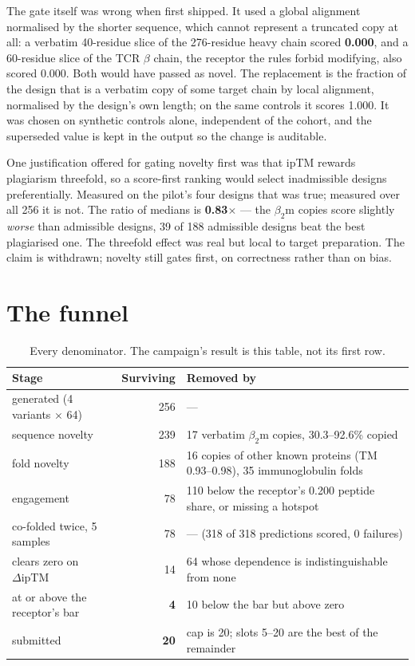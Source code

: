 \documentclass[11pt,a4paper]{article}
\newcommand{\drop}{\ensuremath{\Delta\text{ipTM}}}
\begin{document}
The gate itself was wrong when first shipped. It used a global alignment normalised by the shorter
sequence, which cannot represent a truncated copy at all: a verbatim 40-residue slice of the
276-residue heavy chain scored \textbf{0.000}, and a 60-residue slice of the TCR $\beta$ chain,
the receptor the rules forbid modifying, also scored 0.000. Both would have passed as novel. The
replacement is the fraction of the design that is a verbatim copy of some target chain by local
alignment, normalised by the design's own length; on the same controls it scores 1.000. It was
chosen on synthetic controls alone, independent of the cohort, and the superseded value is kept in
the output so the change is auditable.

One justification offered for gating novelty first was that ipTM rewards plagiarism threefold, so
a score-first ranking would select inadmissible designs preferentially. Measured on the pilot's
four designs that was true; measured over all 256 it is not. The ratio of medians is
\textbf{0.83$\times$} --- the $\beta_2$m copies score slightly \emph{worse} than admissible
designs, 39 of 188 admissible designs beat the best plagiarised one. The threefold effect was real
but local to target preparation. The claim is withdrawn; novelty still gates first, on
correctness rather than on bias.

\section{The funnel}

\begin{table}[h]
\centering
\caption{Every denominator. The campaign's result is this table, not its first row.}
\small
\begin{tabular}{lrp{8.4cm}}
\toprule
Stage & Surviving & Removed by \\
\midrule
generated (4 variants $\times$ 64) & 256 & --- \\
sequence novelty & 239 & 17 verbatim $\beta_2$m copies, 30.3--92.6\% copied \\
fold novelty & 188 & 16 copies of other known proteins (TM 0.93--0.98), 35 immunoglobulin folds \\
engagement & 78 & 110 below the receptor's 0.200 peptide share, or missing a hotspot \\
co-folded twice, 5 samples & 78 & --- (318 of 318 predictions scored, 0 failures) \\
clears zero on \drop & 14 & 64 whose dependence is indistinguishable from none \\
at or above the receptor's bar & \textbf{4} & 10 below the bar but above zero \\
submitted & \textbf{20} & cap is 20; slots 5--20 are the best of the remainder \\
\bottomrule
\end{tabular}
\end{table}
\end{document}
